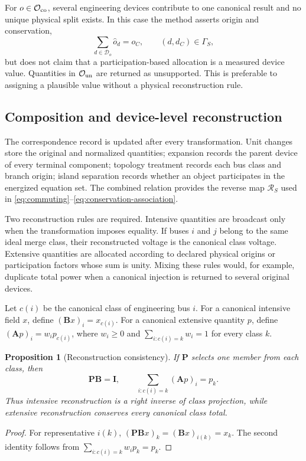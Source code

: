 \documentclass[final,5p,times,twocolumn]{elsarticle}
\newcommand{\Rmap}{\mathcal R}
\newtheorem{proposition}{Proposition}
\begin{document}
For $o\in\mathcal O_{\rm co}$, several engineering devices contribute to one
canonical result and no unique physical split exists. In this case the method
asserts origin and conservation,
\begin{equation}
 \sum_{d\in\mathcal D_o} \widehat{o}_d=o_C,
 \qquad (d,d_C)\in\Gamma_S,
 \label{eq:conservation-association}
\end{equation}
but does not claim that a participation-based allocation is a measured device
value. Quantities in $\mathcal O_{\rm un}$ are returned as unsupported. This is
preferable to assigning a plausible value without a physical reconstruction
rule.

\subsection{Composition and device-level reconstruction}

The correspondence record is updated after every transformation. Unit changes
store the original and normalized quantities; expansion records the parent
device of every terminal component; topology treatment records each bus class
and branch origin; island separation records whether an object participates in
the energized equation set. The combined relation provides the reverse map
$\Rmap_S$ used in \eqref{eq:commuting}--\eqref{eq:conservation-association}.

Two reconstruction rules are required. Intensive quantities are broadcast only
when the transformation imposes equality. If buses $i$ and $j$ belong to the
same ideal merge class, their reconstructed voltage is the canonical class
voltage. Extensive quantities are allocated according to declared physical
origins or participation factors whose sum is unity. Mixing these rules would,
for example, duplicate total power when a canonical injection is returned to
several original devices.

Let $c(i)$ be the canonical class of engineering bus $i$. For a canonical
intensive field $x$, define $(\bm Bx)_i=x_{c(i)}$. For a canonical extensive
quantity $p$, define $(\bm Ap)_i=w_i p_{c(i)}$, where $w_i\ge0$ and
$\sum_{i:c(i)=k}w_i=1$ for every class $k$.
\begin{proposition}[Reconstruction consistency]
\label{prop:reconstruction-consistency}
If $\bm P$ selects one member from each class, then
\begin{equation}
 \bm P\bm B=\bm I,
 \qquad
 \sum_{i:c(i)=k}(\bm Ap)_i=p_k.
 \label{eq:reconstruction-identities}
\end{equation}
Thus intensive reconstruction is a right inverse of class projection, while
extensive reconstruction conserves every canonical class total.
\end{proposition}
\begin{proof}
For representative $i(k)$, $(\bm P\bm Bx)_k=(\bm Bx)_{i(k)}=x_k$.
The second identity follows from
$\sum_{i:c(i)=k}w_i p_k=p_k$.
\end{proof}
\end{document}
